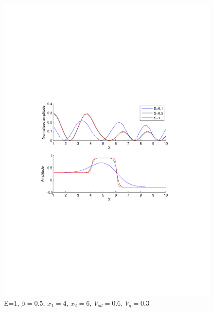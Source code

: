 \documentclass[a4paper]{article}
\begin{document}
\begin{figure}[h!]
\centering
\includegraphics[width=4.5in]{test2}
\caption{E=1, $\beta=0.5$, $x_1=4$, $x_2=6$, $V_{sd}=0.6$, $V_g=0.3$}
\label{fig:test2}
\end{figure}
\newpage
\end{document}
